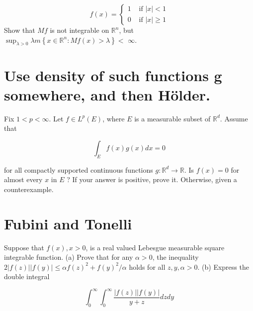 \documentclass[lang=cn,11pt]{elegantbook}
\begin{document}
$$
f(x)= \begin{cases}1 & \text { if }|x|<1 \\ 0 & \text { if }|x| \geq 1\end{cases}
$$
Show that $M f$ is not integrable on $\mathbb{R}^n$, but $\sup _{\lambda>0} \lambda m\left\{x \in \mathbb{R}^n: M f(x)>\lambda\right\}<$ $\infty$.\newline
\newline
\newline
\newline
\newline
\newline
\newline
\newline
\newline





\section{Use density of such functions g somewhere, and then Hölder.}
Fix $1<p<\infty$. Let $f \in L^p(E)$, where $E$ is a measurable subset of $\mathbb{R}^d$. Assume that

$$
\int_E f(x) g(x) d x=0
$$

for all compactly supported continuous functions $g: \mathbb{R}^d \rightarrow \mathbb{R}$. Is $f(x)=0$ for almost every $x$ in $E$ ? If your answer is positive, prove it. Otherwise, given a counterexample.\newline
\newline
\newline
\newline
\newline
\newline
\newline
\newline
\newline



\section{Fubini and Tonelli}
Suppose that $f(x), x>0$, is a real valued Lebesgue measurable square integrable function.
(a) Prove that for any $\alpha>0$, the inequality $2|f(z)||f(y)| \leq \alpha f(z)^2+f(y)^2 / \alpha$ holds for all $z, y, \alpha>0$.
(b) Express the double integral

$$
\int_0^{\infty} \int_0^{\infty} \frac{|f(z)||f(y)|}{y+z} d z d y
$$
\end{document}
